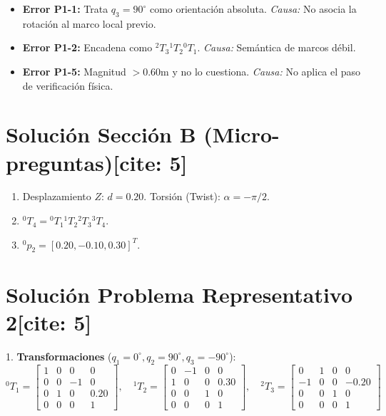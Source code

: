 \documentclass[11pt, a4paper]{article}
\begin{document}
\begin{tcolorbox}[colback=red!5, colframe=red!75!black, title=Diagnóstico de Errores Comunes (Prob 1) {[cite: 5]}]
\begin{itemize}
    \item \textbf{Error P1-1:} Trata $q_3=90^\circ$ como orientación absoluta. \textit{Causa:} No asocia la rotación al marco local previo.
    \item \textbf{Error P1-2:} Encadena como ${}^2T_3{}^1T_2{}^0T_1$. \textit{Causa:} Semántica de marcos débil.
    \item \textbf{Error P1-5:} Magnitud $> 0.60\text{m}$ y no lo cuestiona. \textit{Causa:} No aplica el paso de verificación física.
\end{itemize}
\end{tcolorbox}

\section*{Solución Sección B (Micro-preguntas)[cite: 5]}
\begin{enumerate}
    \item Desplazamiento $Z$: $d = 0.20$. Torsión (Twist): $\alpha = -\pi/2$.
    \item ${}^0T_4 = {}^0T_1 {}^1T_2 {}^2T_3 {}^3T_4$.
    \item ${}^0p_2 = [0.20, -0.10, 0.30]^T$.
\end{enumerate}

\section*{Solución Problema Representativo 2[cite: 5]}
1. \textbf{Transformaciones} ($q_1=0^\circ, q_2=90^\circ, q_3=-90^\circ$):
\begin{equation*}
    {}^0T_1 = \begin{bmatrix} 1&0&0&0 \\ 0&0&-1&0 \\ 0&1&0&0.20 \\ 0&0&0&1 \end{bmatrix}, \quad
    {}^1T_2 = \begin{bmatrix} 0&-1&0&0 \\ 1&0&0&0.30 \\ 0&0&1&0 \\ 0&0&0&1 \end{bmatrix}, \quad
    {}^2T_3 = \begin{bmatrix} 0&1&0&0 \\ -1&0&0&-0.20 \\ 0&0&1&0 \\ 0&0&0&1 \end{bmatrix}
\end{equation*}
\end{document}

